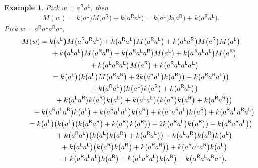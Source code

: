 \documentclass[pdftex]{sigma}
\newcommand\LL{{\mathsf{L}}}
\newcommand\RR{{\mathsf{R}}}
\numberwithin{equation}{section}
\newtheorem{Example}[Theorem]{Example}
\begin{document}
\begin{Example}
	Pick $w=a^{\RR}a^{\LL}$, then
	\begin{align*}
		M(w) = k\big(a^{\LL}\big)M\big(a^{\RR}\big) + k\big(a^{\RR} a^{\LL}\big) = k\big(a^{\LL}\big)k\big(a^{\RR}\big) + k\big(a^{\RR} a^{\LL}\big).
	\end{align*}
	Pick $w = a^{\RR} a^{\LL} a^{\RR} a^{\LL}$,
	\begin{gather*}
		M(w) = k\big(a^{\LL}\big) M\big(a^{\RR}a^{\RR} a^{\LL}\big) + k\big(a^{\RR} a^{\LL} \big)M\big(a^{\RR} a^{\LL}\big) + k\big(a^{\LL} a^{\RR}\big)M\big(a^{\RR}\big)M\big(a^{\LL}\big) \\
\hphantom{M(w) =}{}
+ k\big(a^{\LL} a^{\LL}\big)M\big(a^{\RR}a^{\RR}\big)+ k\big(a^{\RR}a^{\LL}a^{\RR}\big)M\big(a^{\LL}\big) + k\big(a^{\RR} a^{\LL} a^{\LL}\big)M\big(a^{\RR}\big) \\
\hphantom{M(w) =}{}
+ k\big(a^{\LL} a^{\RR} a^{\LL}\big)M\big(a^{\RR}\big)+ k\big(a^{\RR} a^{\LL} a^{\LL} a^{\LL}\big) \\
\hphantom{M(w)}{}
 = k\big(a^{\LL}\big)\big(k\big(a^{\LL}\big)M\big(a^{\RR}a^{\RR}\big) + 2k\big(a^\RR a^{\LL}\big)k\big(a^{\RR}\big)\big) + k\big(a^{\RR}a^\RR a^{\LL}\big)\big) \\
\hphantom{M(w) =}{}
+ k\big(a^{\RR} a^{\LL}\big)\big(k\big(a^{\LL}\big)k\big(a^{\RR}\big) + k\big(a^{\RR} a^{\LL}\big)\big) \\
\hphantom{M(w) =}{}
+ k\big(a^{\LL} a^{\RR}\big)k\big(a^{\RR}\big)k\big(a^{\LL}\big) + k\big(a^{\LL}a^{\LL}\big)\big(k\big(a^{\RR}\big)k\big(a^{\RR}\big)+k\big(a^\RR a^\RR\big)\big) \\
\hphantom{M(w) =}{}
		 + k\big(a^{\RR} a^{\LL} a^{\RR}\big)k\big(a^{\LL}\big) + k\big(a^{\RR} a^{\LL} a^{\LL}\big)k\big(a^{\RR}\big) + k\big(a^{\LL} a^{\RR} a^{\LL}\big)k\big(a^{\RR}\big) +k\big(a^{\RR} a^{\LL} a^{\RR} a^{\LL}\big) \\
\hphantom{M(w)}{}
 = k\big(a^{\LL}\big)\big(k\big(a^{\LL}\big)\big(k\big(a^{\RR}a^{\RR}\big)+k\big(a^\RR\big)k\big(a^\RR\big)\big) + 2k\big(a^\RR a^{\LL}\big)k\big(a^{\RR}\big)\big) + k\big(a^{\RR}a^\RR a^{\LL}\big)\big)\\
\hphantom{M(w) =}{}
 + k\big(a^{\RR} a^{\LL}\big)\big(k\big(a^{\LL}\big)k\big(a^{\RR}\big) + k\big(a^{\RR} a^{\LL}\big)\big)
		 + k\big(a^{\LL} a^{\RR}\big)k\big(a^{\RR}\big)k\big(a^{\LL}\big) \\
\hphantom{M(w) =}{}
+ k\big(a^{\LL}a^{\LL}\big)\big(k\big(a^{\RR}\big)k\big(a^{\RR}\big)+k\big(a^\RR a^\RR\big)\big) + k\big(a^{\RR} a^{\LL} a^{\RR}\big)k\big(a^{\LL}\big) \\
\hphantom{M(w) =}{}
		 + k\big(a^{\RR} a^{\LL} a^{\LL}\big)k\big(a^{\RR}\big) + k\big(a^{\LL} a^{\RR} a^{\LL}\big)k\big(a^{\RR}\big)
		 +k\big(a^{\RR} a^{\LL} a^{\RR} a^{\LL}\big).
	\end{gather*}
\end{Example}
\end{document}
